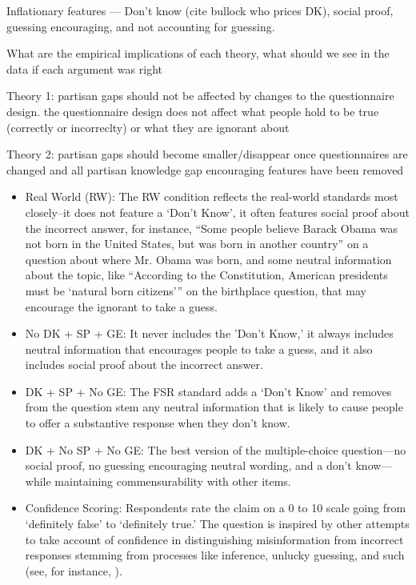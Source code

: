 \documentclass[12pt, letterpaper]{article}
\begin{document}
Inflationary features --- Don't know (cite bullock who prices DK), social proof, guessing encouraging, and not accounting for guessing.

What are the empirical implications of each theory, what should we see in the data if each argument was right

Theory 1: partisan gaps should not be affected by changes to the questionnaire design. the questionnaire design does not affect what people hold to be true (correctly or incorreclty) or what they are ignorant about

Theory 2: partisan gaps should become smaller/disappear once questionnaires are changed and all partisan knowledge gap encouraging features have been removed


\begin{itemize}

	\item Real World (RW): The RW condition reflects the real-world standards most closely--it does not feature a `Don't Know', it often features social proof about the incorrect answer, for instance, ``Some people believe Barack Obama was not born in the United States, but was born in another country'' on a question about where Mr. Obama was born, and some neutral information about the topic, like ``According to the Constitution, American presidents must be `natural born citizens''' on the birthplace question, that may encourage the ignorant to take a guess.
	
	\item No DK +  SP + GE: It never includes the 'Don't Know,' it always includes neutral information that encourages people to take a guess, and it also includes social proof about the incorrect answer.
	
	\item DK + SP + No GE: The FSR standard adds a `Don't Know’ and removes from the question stem any neutral information that is likely to cause people to offer a substantive response when they don't know.
	
	\item DK + No SP + No GE: The best version of the multiple-choice question---no social proof, no guessing encouraging neutral wording, and a don't know---while maintaining commensurability with other items. 
	
	\item Confidence Scoring: Respondents rate the claim on a 0 to 10 scale going from `definitely false' to `definitely true.' The question is inspired by other attempts to take account of confidence in distinguishing misinformation from incorrect responses stemming from processes like inference, unlucky guessing, and such (see, for instance, \citep{pasek2015}).

\end{itemize}
\end{document}
